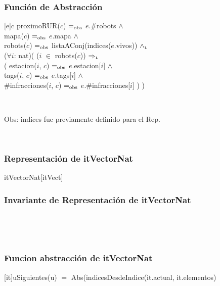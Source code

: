 
\subsubsection{Funci\'on de Abstracci\'on}
  
  [e]{c}{
    proximoRUR($c$) $=_{\mathrm{obs}}$ $e$.\#robots $\land$ \\
    mapa($c$) $=_{\mathrm{obs}}$ $e$.mapa $\land$ \\
    robots($c$) $=_{\mathrm{obs}}$ listaAConj(indices($e$.vivos)) $\land_{\mathrm{\scriptscriptstyle{L}}}$ \\
    ($\forall i$: nat)(
      ($i$ $\in$ robots($c$)) $\Rightarrow_{\mathrm{\scriptscriptstyle{L}}}$ \\ (
        estacion($i$, $c$) $=_{\mathrm{obs}}$ $e$.estacion[$i$] $\land$ \\
        tags($i$, $c$) $=_{\mathrm{obs}}$  $e$.tags[$i$] $\land$ \\
        \#infracciones($i$, $c$) $=_{\mathrm{obs}}$  $e$.\#infracciones[$i$]
      )
    )
  }

  ~     

  Obs: indices fue previamente definido para el Rep.

  ~     
  

  \subsubsection{Representaci\'on de itVectorNat}

  \begin{Estructura}{itVectorNat}[itVect]
    \begin{Tupla}[itVect]
    \end{Tupla}
  \end{Estructura}
  
  \subsubsection{Invariante de Representaci\'on de itVectorNat}
  
  ~

  
  ~

  \subsubsection{Funcion abstracci\'on de itVectorNat}
  [it]{u}{Siguientes(u) $=$ Abs(indicesDesdeIndice(it.actual, it.elementos)}

